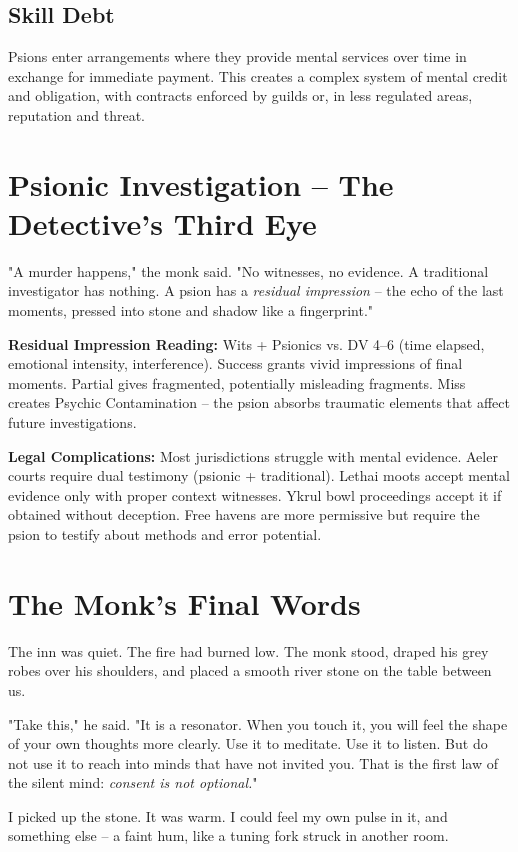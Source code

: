 \documentclass[10pt,a5paper]{book}
\begin{document}
\subsection{Skill Debt}
Psions enter arrangements where they provide mental services over time in exchange for immediate payment. This creates a complex system of mental credit and obligation, with contracts enforced by guilds or, in less regulated areas, reputation and threat.

\section{Psionic Investigation -- The Detective's Third Eye}

"A murder happens," the monk said. "No witnesses, no evidence. A traditional investigator has nothing. A psion has a \textit{residual impression} -- the echo of the last moments, pressed into stone and shadow like a fingerprint."

\textbf{Residual Impression Reading:} Wits + Psionics vs. DV 4--6 (time elapsed, emotional intensity, interference). Success grants vivid impressions of final moments. Partial gives fragmented, potentially misleading fragments. Miss creates Psychic Contamination -- the psion absorbs traumatic elements that affect future investigations.

\textbf{Legal Complications:} Most jurisdictions struggle with mental evidence. Aeler courts require dual testimony (psionic + traditional). Lethai moots accept mental evidence only with proper context witnesses. Ykrul bowl proceedings accept it if obtained without deception. Free havens are more permissive but require the psion to testify about methods and error potential.

\section{The Monk's Final Words}

The inn was quiet. The fire had burned low. The monk stood, draped his grey robes over his shoulders, and placed a smooth river stone on the table between us.

"Take this," he said. "It is a resonator. When you touch it, you will feel the shape of your own thoughts more clearly. Use it to meditate. Use it to listen. But do not use it to reach into minds that have not invited you. That is the first law of the silent mind: \textit{consent is not optional.}"

I picked up the stone. It was warm. I could feel my own pulse in it, and something else -- a faint hum, like a tuning fork struck in another room.
\end{document}
